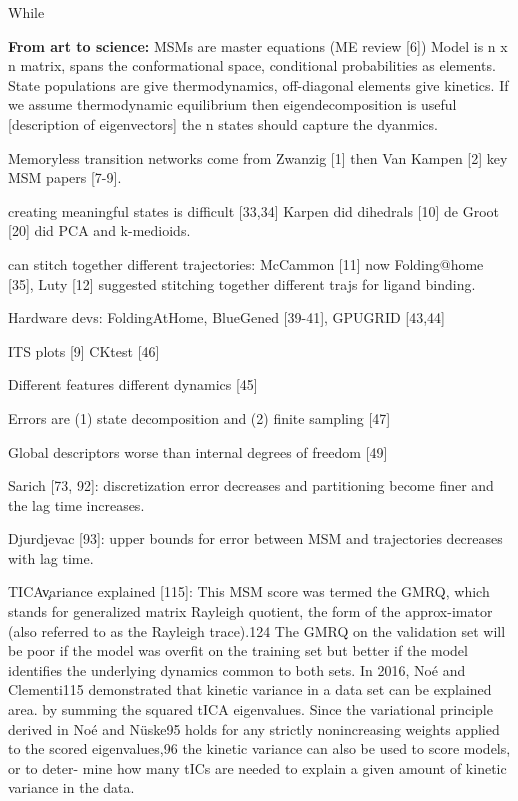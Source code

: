 While 





\textbf{From art to science:} 
MSMs are master equations (ME review [6])
Model is n x n matrix, spans the conformational space, conditional probabilities as elements. 
State populations are give thermodynamics, off-diagonal elements give kinetics. 
If we assume thermodynamic equilibrium then eigendecomposition is useful [description of eigenvectors]
the n states should capture the dyanmics. 

Memoryless transition networks come from Zwanzig [1] then Van Kampen [2] key MSM papers [7-9]. 

creating meaningful states is difficult [33,34] Karpen did dihedrals [10] de Groot [20] did PCA and k-medioids.

can stitch together different trajectories: McCammon [11] now Folding@home [35], Luty [12] suggested stitching together different trajs for ligand binding. 

Hardware devs: FoldingAtHome, BlueGened [39-41], GPUGRID [43,44]

ITS plots [9] CKtest [46]

Different features different dynamics [45]

Errors are (1) state decomposition and (2) finite sampling [47]

Global descriptors worse than internal degrees of freedom [49]

Sarich [73, 92]: discretization error decreases and partitioning become finer and the lag time increases. 

Djurdjevac [93]: upper bounds for error between MSM and trajectories decreases with lag time. 

TICA\c variance explained [115]:
This MSM score was termed the GMRQ, which stands for
generalized matrix Rayleigh quotient, the form of the approx-imator (also referred to as the Rayleigh trace).124
The GMRQ on the validation set will be poor if the model was overfit on the
training set but better if the model identifies the underlying
dynamics common to both sets. In 2016, Noé and Clementi115 demonstrated that kinetic variance in a data set can be explained area.
by summing the squared tICA eigenvalues. Since the variational principle derived in Noé and Nüske95 holds for any strictly nonincreasing weights applied to the scored eigenvalues,96 the kinetic variance can also be used to score models, or to deter- mine how many tICs are needed to explain a given amount of kinetic variance in the data.

